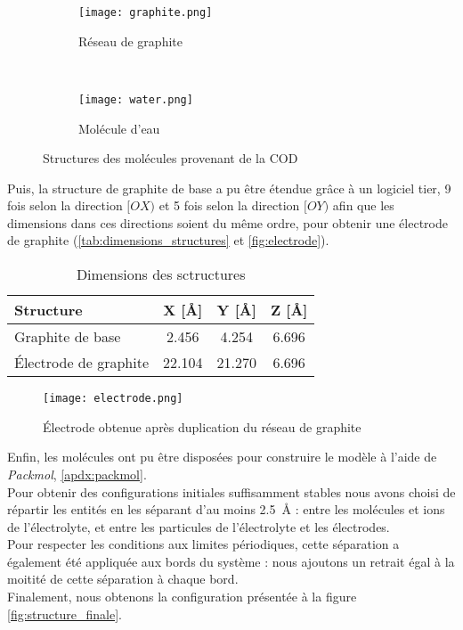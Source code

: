 \begin{figure}[hbt]
	\centering
	\begin{subfigure}[t]{.49\textwidth}
		\centering
		\texttt{[image: graphite.png]}
		\caption{Réseau de graphite}
	\end{subfigure}%
    ~
	\begin{subfigure}[t]{.49\textwidth}
		\centering
		\texttt{[image: water.png]}
		\caption{Molécule d'eau}
	\end{subfigure}
	\caption{Structures des molécules provenant de la COD}
	\label{fig:molecules_initiales}
\end{figure}

Puis, la structure de graphite de base a pu être étendue grâce à un logiciel tier\cite{momma_vesta_2011}, \num{9} fois selon la direction $[OX)$ et \num{5} fois selon la direction $[OY)$ afin que les dimensions dans ces directions soient du même ordre, pour obtenir une électrode de graphite (\autoref{tab:dimensions_structures} et \autoref{fig:electrode}).

\begin{table}[htb]
    \centering
    \begin{tabular}{l c c c}
        \hline
        Structure &X [Å] &Y [Å] &Z [Å]\\
        \hline
        Graphite de base &\num{2.456} &\num{4.254} &\num{6.696}\\
        Électrode de graphite &\num{22.104} &\num{21.270} &\num{6.696}\\
        \hline
    \end{tabular}
    \caption{Dimensions des sctructures}
    \label{tab:dimensions_structures}
\end{table}

\begin{figure}[htb]
    \centering
    \texttt{[image: electrode.png]}
    \caption{Électrode obtenue après duplication du réseau de graphite}
    \label{fig:electrode}
\end{figure}

Enfin, les molécules ont pu être disposées pour construire le modèle à l'aide de \emph{Packmol}\cite{martinez_packmol_2009}, \autoref{apdx:packmol}.\\
Pour obtenir des configurations initiales suffisamment stables nous avons choisi de répartir les entités en les séparant d'au moins \qty{2.5}{\angstrom} : entre les molécules et ions de l'électrolyte, et entre les particules de l'électrolyte et les électrodes.\\
Pour respecter les conditions aux limites périodiques, cette séparation a également été appliquée aux bords du système : nous ajoutons un retrait égal à la moitité de cette séparation à chaque bord.\\
Finalement, nous obtenons la configuration présentée à la figure \autoref{fig:structure_finale}.

